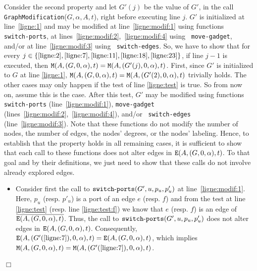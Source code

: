 \documentclass[11pt]{article}
\newcommand{\qed}{\hfill $\Box$ \bigbreak}
\newenvironment{proof}{\noindent {\bf Proof.}}{\qed}
\begin{document}
{\begin{proof}
  Consider the second property and let $G'(j)$ be the value of $G'$, in the call {\tt
    GraphModification}($G,\alpha,A,t$),
  right before executing line $j$.
  $G'$ is initialized at line~\ref{ligne:1} and may be modified
  at line~\ref{ligne:modif:1} using functions {\tt
    switch\mbox{-}ports}, at
  lines~\ref{ligne:modif:2},~\ref{ligne:modif:4} using {\tt
    move\mbox{-}gadget}, and/or at line~\ref{ligne:modif:3} using {\tt
    switch\mbox{-}edges}. 
  So, we have to show that for every $j \in\{\ref{ligne:2},
  \ref{ligne:7}, \ref{ligne:11}, \ref{ligne:18},\ref{ligne:23}\}$, if
  line $j-1$ is executed, then ${\tt M}(A,(G,0,\alpha),t)={\tt
    M}(A,(G'(j),0,\alpha),t)$.
%  
First, since $G'$ is initialized to $G$ at line \ref{ligne:1}, ${\tt M}(A,(G,0,\alpha),t)={\tt
    M}(A,(G'(2),0,\alpha),t)$ trivially holds.
%
The other cases may only happen if the test of line \ref{ligne:test}
is true. So from now on, assume this is the case.  After this test,
$G'$ may be modified using functions {\tt switch\mbox{-}ports}
(line~\ref{ligne:modif:1}), {\tt move\mbox{-}gadget}
(lines~\ref{ligne:modif:2},~\ref{ligne:modif:4}), and/or {\tt
  switch\mbox{-}edges} (line~\ref{ligne:modif:3}). Note that these
functions do not modify the number of nodes, the number of edges, the
nodes' degrees, or the nodes' labeling. Hence, to establish that the
property holds in all remaining cases, it is sufficient to show that
each call to these functions does not alter edges in ${\tt
  E}(A,(G,0,\alpha),t)$. To that goal and by their definitions, we just
need to show that these calls do not involve already explored edges.
\begin{itemize}
  \item Consider first the call to ${\tt
    switch\mbox{-}ports}(G',u,p_u,p'_u)$ at
    line~\ref{ligne:modif:1}. Here, $p_u$ (resp. $p'_u$) is a port of
    an edge $e$ (resp. $f$) and from the test at line \ref{ligne:test}
    (resp. line \ref{ligne:test:f}) we know that $e$ (resp. $f$) is an
    edge of $\overline{{\tt E}(A,(G,0,\alpha),t)}$. Thus, the call to
    ${\tt switch\mbox{-}ports}(G',u,p_u,p'_u)$ does not alter edges in
    ${\tt E}(A,(G,0,\alpha),t)$. Consequently, ${\tt
      E}(A,(G'(\ref{ligne:7}),0,\alpha),t) = {\tt
      E}(A,(G,0,\alpha),t)$, which implies ${\tt
      M}(A,(G,0,\alpha),t)={\tt M}(A,(G'(\ref{ligne:7}),0,\alpha),t)$.


\end{itemize}
\end{proof}}
\end{document}
